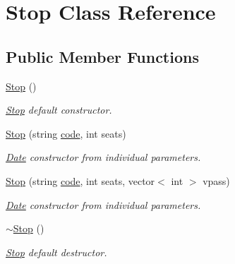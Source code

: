 \hypertarget{class_stop}{}\section{Stop Class Reference}
\label{class_stop}
\subsection*{Public Member Functions}
\begin{DoxyCompactItemize}
\item 
\hyperlink{group___stop_gab8870f949c69cda03c4055524ed13c31}{Stop} ()
\begin{DoxyCompactList}\small\item\em \hyperlink{class_stop}{Stop} default constructor. \end{DoxyCompactList}\item 
\hyperlink{group___stop_gaa89c250884ae1407ac8647a8a3a58995}{Stop} (string \hyperlink{group___stop_ga5a0dddd108225fd437be86eed7b3a3ef}{code}, int seats)
\begin{DoxyCompactList}\small\item\em \hyperlink{class_date}{Date} constructor from individual parameters. \end{DoxyCompactList}\item 
\hyperlink{group___stop_ga843a7424de0129e7f6f066d2f8f1d1bc}{Stop} (string \hyperlink{group___stop_ga5a0dddd108225fd437be86eed7b3a3ef}{code}, int seats, vector$<$ int $>$ vpass)
\begin{DoxyCompactList}\small\item\em \hyperlink{class_date}{Date} constructor from individual parameters. \end{DoxyCompactList}\item 
\hyperlink{group___stop_ga24e85edfa98a7a0212136679b6fad6d2}{$\sim$\+Stop} ()
\begin{DoxyCompactList}\small\item\em \hyperlink{class_stop}{Stop} default destructor. \end{DoxyCompactList}\end{DoxyCompactItemize}
